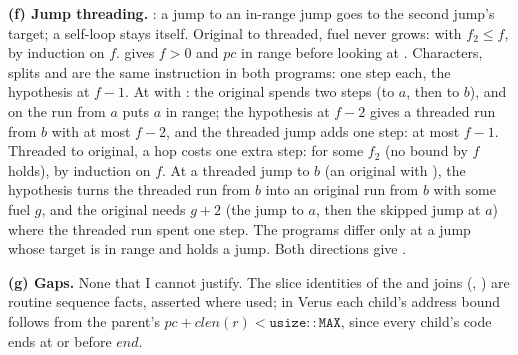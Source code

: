 \documentclass[11pt]{article}
\begin{document}
\begin{answer}
\textbf{(f) Jump threading.} : a jump to an
in-range jump goes to the second jump's target; a self-loop stays itself.
Original to threaded, fuel never grows:
 with $f_2 \le
f$, by induction on $f$.  gives $f > 0$ and $pc$ in range
before looking at . Characters, splits and  are the same
instruction in both programs: one step each, the hypothesis at $f-1$. At
 with : the original spends two steps (to
$a$, then to $b$), and  on the run from $a$ puts $a$ in
range; the hypothesis at $f - 2$ gives a threaded run from $b$ with at most
$f - 2$, and the threaded jump adds one step: at most $f - 1$. Threaded to original, a
hop costs one extra step:  for some $f_2$ (no bound by $f$ holds), by induction on $f$. At a
threaded jump to $b$ (an original  with ),
the hypothesis turns the threaded run from $b$ into an original run from $b$
with some fuel $g$, and the original needs $g + 2$ (the jump to $a$, then the
skipped jump at $a$) where the threaded run spent one step. The programs differ only at a jump whose target is
in range and holds a jump. Both directions give
.

\textbf{(g) Gaps.} None that I cannot justify. The slice identities of the
 and  joins (,
) are routine sequence facts, asserted where
used; in Verus each child's address bound follows from the parent's
$pc + \mathit{clen}(r) < \mathtt{usize::MAX}$, since every child's code ends at
or before $\mathit{end}$.
\end{answer}
\end{document}
